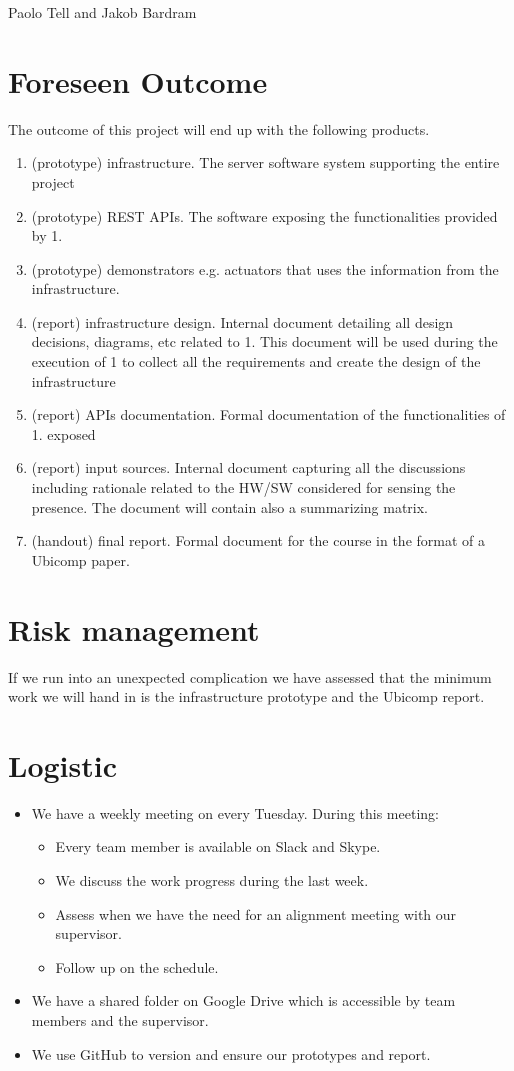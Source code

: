 \documentclass{sigchi}
\begin{document}
Paolo Tell and Jakob Bardram

\section{Foreseen Outcome}

The outcome of this project will end up with the following products.
\begin{enumerate}
\item (prototype) infrastructure. The server software system supporting the entire project
\item (prototype) REST APIs. The software exposing the functionalities provided by 1.
\item (prototype) demonstrators e.g. actuators that uses the information from the infrastructure.
\item (report) infrastructure design. Internal document detailing all design decisions, diagrams, etc related to 1. This document will be used during the execution of 1 to collect all the requirements and create the design of the infrastructure
\item (report) APIs documentation. Formal documentation of the functionalities of 1. exposed
\item (report) input sources. Internal document capturing all the discussions including rationale related to the HW/SW considered for sensing the presence.  The document will contain also a summarizing matrix.
\item (handout) final report. Formal document for the course in the format of a Ubicomp paper.
\end{enumerate}

\section{Risk management}

If we run into an unexpected complication we have assessed that the minimum work we will hand in is the infrastructure prototype and the Ubicomp report.

\section{Logistic}

\begin{itemize}
\item We have a weekly meeting on every Tuesday. During this meeting:
    \begin{itemize}
    \item Every team member is available on Slack and Skype.
    \item We discuss the work progress during the last week.
    \item Assess when we have the need for an alignment meeting with our supervisor.
    \item Follow up on the schedule.
    \end{itemize}
\item We have a shared folder on Google Drive which is accessible by team members and the supervisor.
\item We use GitHub to version and ensure our prototypes and report.
\end{itemize}
\end{document}
